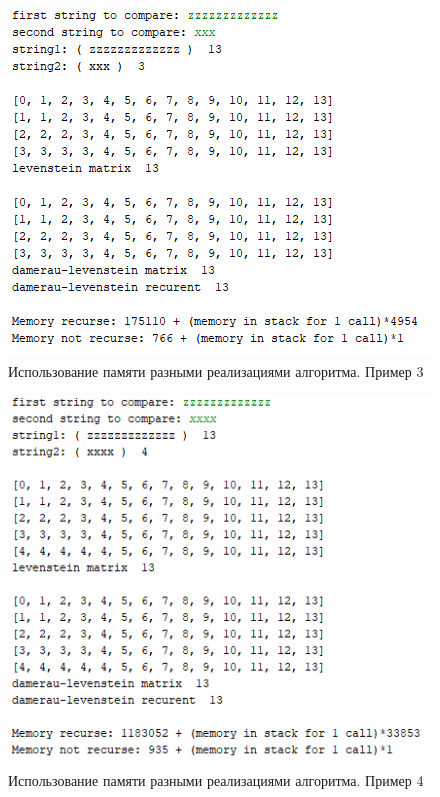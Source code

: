 \documentclass[a4paper,12pt]{report}
\begin{document}
\begin{center}
\begin{flushleft}
			\newpage
			\begin{figure}[h!]
				\includegraphics[width=1\linewidth]{test9.jpg}
				\caption{Использование памяти разными реализациями алгоритма. Пример 3}
				\label{ris:test9}
			\end{figure}
		
			\newpage
			\begin{figure}[h!]
				\includegraphics[width=1\linewidth]{test8.jpg}
				\caption{Использование памяти разными реализациями алгоритма. Пример 4}
				\label{ris:test10}
			\end{figure}
 

\end{flushleft}
\end{center}
\end{document}
